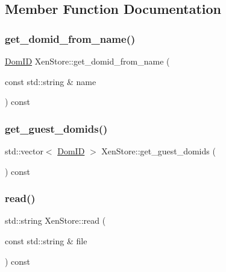 \subsection{Member Function Documentation}
\mbox{\label{classxd_1_1xen_1_1_xen_store_a68682bd23384e318b6ab15ed17e7a43c}} 
\subsubsection{\texorpdfstring{get\+\_\+domid\+\_\+from\+\_\+name()}{get\_domid\_from\_name()}}
{\footnotesize\ttfamily \mbox{\hyperlink{namespacexd_1_1xen_aaad6b5eb6f7e5ba76a4e4ca166ac8a08}{Dom\+ID}} Xen\+Store\+::get\+\_\+domid\+\_\+from\+\_\+name (\begin{DoxyParamCaption}\item[{const std\+::string \&}]{name }\end{DoxyParamCaption}) const}

\mbox{\label{classxd_1_1xen_1_1_xen_store_ac3a0e70e284c8f66d4e0cc3e70d88122}} 
\subsubsection{\texorpdfstring{get\+\_\+guest\+\_\+domids()}{get\_guest\_domids()}}
{\footnotesize\ttfamily std\+::vector$<$ \mbox{\hyperlink{namespacexd_1_1xen_aaad6b5eb6f7e5ba76a4e4ca166ac8a08}{Dom\+ID}} $>$ Xen\+Store\+::get\+\_\+guest\+\_\+domids (\begin{DoxyParamCaption}{ }\end{DoxyParamCaption}) const}

\mbox{\label{classxd_1_1xen_1_1_xen_store_ab09ebbeb66a95ccd352ff2bda4a65562}} 
\subsubsection{\texorpdfstring{read()}{read()}}
{\footnotesize\ttfamily std\+::string Xen\+Store\+::read (\begin{DoxyParamCaption}\item[{const std\+::string \&}]{file }\end{DoxyParamCaption}) const}


